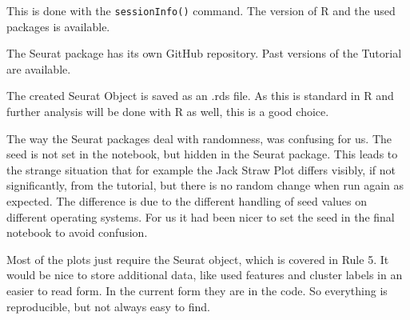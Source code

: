 \documentclass[a4paper, 10pt]{scrartcl}
\begin{document}
This is done with the \texttt{sessionInfo()} command. The version of R
and the used packages is available.

\hypertarget{rule-4-version-control-all-custom-scripts}{%
\label{rule-4-version-control-all-custom-scripts}}

The Seurat package has its own GitHub repository. Past versions of the
Tutorial are available.

\hypertarget{rule-5-record-all-intermediate-results-when-possible-in-standardized-formats}{%
\label{rule-5-record-all-intermediate-results-when-possible-in-standardized-formats}}

The created Seurat Object is saved as an .rds file. As this is standard
in R and further analysis will be done with R as well, this is a good
choice.

\hypertarget{rule-6-for-analyses-that-include-randomness-note-underlying-random-seeds}{%
\label{rule-6-for-analyses-that-include-randomness-note-underlying-random-seeds}}

The way the Seurat packages deal with randomness, was confusing for us.
The seed is not set in the notebook, but hidden in the Seurat package.
This leads to the strange situation that for example the Jack Straw Plot
differs visibly, if not significantly, from the tutorial, but there is
no random change when run again as expected. The difference is due to
the different handling of seed values on different operating systems.
For us it had been nicer to set the seed in the final notebook to avoid
confusion.

\hypertarget{rule-7-always-store-raw-data-behind-plots}{%
\label{rule-7-always-store-raw-data-behind-plots}}

Most of the plots just require the Seurat object, which is covered in
Rule 5. It would be nice to store additional data, like used features
and cluster labels in an easier to read form. In the current form they
are in the code. So everything is reproducible, but not always easy to
find.

\hypertarget{rule-8-generate-hierarchical-analysis-output-allowing-layers-of-increasing-detail-to-be-inspected}{%
\label{rule-8-generate-hierarchical-analysis-output-allowing-layers-of-increasing-detail-to-be-inspected}}
\end{document}
